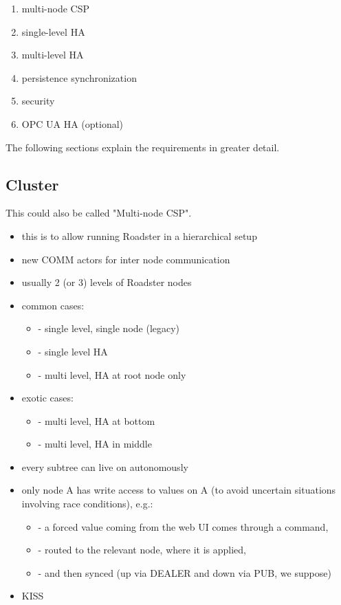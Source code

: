\begin{enumerate}
\item multi-node CSP
\item single-level HA
\item multi-level HA
\item persistence synchronization
\item security
\item OPC UA HA (optional)
\end{enumerate}

The following sections explain the requirements in greater detail.

\subsection{Cluster}
This could also be called "Multi-node CSP".

\begin{itemize}
\item this is to allow running Roadster in a hierarchical setup
\item new COMM actors for inter node communication
\item usually 2 (or 3) levels of Roadster nodes
\item common cases:
\begin{itemize}
\item   - single level, single node (legacy)
\item   - single level HA
\item   - multi level, HA at root node only
\end{itemize}
\item exotic cases:
\begin{itemize}
\item   - multi level, HA at bottom
\item   - multi level, HA in middle
\end{itemize}
\item every subtree can live on autonomously
\item only node A has write access to values on A (to avoid uncertain situations involving race conditions), e.g.:
\begin{itemize}
\item - a forced value coming from the web UI comes through a command,
\item - routed to the relevant node, where it is applied,
\item - and then synced (up via DEALER and down via PUB, we suppose)
\end{itemize}
\item KISS
\end{itemize}


